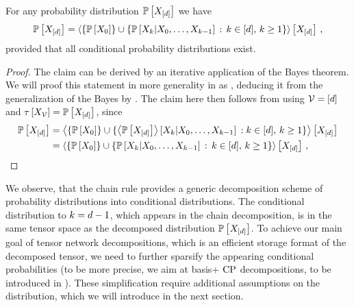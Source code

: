 \begin{theorem}
    \label{the:chainRule}
    For any probability distribution $\mathbb{P}\left[X_{[d]}\right]$ we have
    \begin{align*}
        \mathbb{P}\left[X_{[d]}\right]
        = \left\langle \{\mathbb{P}\left[X_{0}\right]\} \cup
        \left\{\mathbb{P}\left[X_{k}|X_{0},\ldots,X_{k-1}\right]\,:\,k\in[d], \, k\geq 1\right\}
        \right\rangle \left[ X_{[d]} \right] \, ,
    \end{align*}
    provided that all conditional probability distributions exist.
\end{theorem}
\begin{proof}
    The claim can be derived by an iterative application of the Bayes  theorem.
    We will proof this statement in more generality in  as , deducing it from the generalization of the Bayes  by .
    The claim here then follows from  using $\mathcal{V}=[d]$ and $\tau\left[X_{\mathcal{V}}\right]=\mathbb{P}\left[X_{[d]}\right]$, since
    \begin{align*}
        \mathbb{P}\left[X_{[d]}\right]
        &= \left\langle \{\mathbb{P}\left[X_{0}\right]\} \cup
        \{\left\langle \mathbb{P}\left[X_{[d]}\right]\right\rangle \left[ X_{k} | X_{0},\ldots,X_{k-1} \right]  \, : k\in[d], \, k\geq 1\}
        \right\rangle \left[ X_{[d]} \right] \\
        &  = \left\langle \{\mathbb{P}\left[X_{0}\right]\} \cup
        \left\{\mathbb{P}\left[X_{k}|X_{0},\ldots,X_{k-1}\right]\,:\,k\in[d], \, k\geq 1\right\}
        \right\rangle \left[ X_{[d]} \right] \, ,
    \end{align*}
\end{proof}

We observe, that the chain rule provides a generic decomposition scheme of probability distributions into conditional distributions.
The conditional distribution to $k=d-1$, which appears in the chain decomposition, is in the same tensor space as the decomposed distribution $\mathbb{P}\left[X_{[d]}\right]$.
To achieve our main goal of tensor network decompositions, which is an efficient storage format of the decomposed tensor, we need to further sparsify the appearing conditional probabilities (to be more precise, we aim at basis+ $\mathrm{CP}$ decompositions, to be introduced in ).
These simplification require additional assumptions on the distribution, which we will introduce in the next section.

